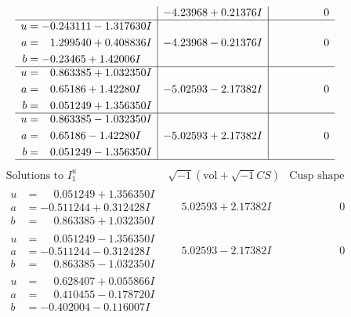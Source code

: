 \documentclass[1p]{elsarticle_modified}
\theoremstyle{definition}
\newcommand{\I}{\sqrt{-1}}
\begin{document}
$$\begin{array}{c|c|c}
 & -4.23968 + 0.21376 I & \phantom{-0.000000 } 0 \\ \hline\begin{aligned}
u &= -0.243111 - 1.317630 I \\
a &= \phantom{-}1.299540 + 0.408836 I \\
b &= -0.23465 + 1.42006 I\end{aligned}
 & -4.23968 - 0.21376 I & \phantom{-0.000000 } 0 \\ \hline\begin{aligned}
u &= \phantom{-}0.863385 + 1.032350 I \\
a &= \phantom{-}0.65186 + 1.42280 I \\
b &= \phantom{-}0.051249 + 1.356350 I\end{aligned}
 & -5.02593 - 2.17382 I & \phantom{-0.000000 } 0 \\ \hline\begin{aligned}
u &= \phantom{-}0.863385 - 1.032350 I \\
a &= \phantom{-}0.65186 - 1.42280 I \\
b &= \phantom{-}0.051249 - 1.356350 I\end{aligned}
 & -5.02593 + 2.17382 I & \phantom{-0.000000 } 0\\
 \hline 
 \end{array}$$\newpage$$\begin{array}{c|c|c}  
\text{Solutions to }I^u_{1}& \I (\text{vol} + \sqrt{-1}CS) & \text{Cusp shape}\\
 \hline 
\begin{aligned}
u &= \phantom{-}0.051249 + 1.356350 I \\
a &= -0.511244 + 0.312428 I \\
b &= \phantom{-}0.863385 + 1.032350 I\end{aligned}
 & \phantom{-}5.02593 + 2.17382 I & \phantom{-0.000000 } 0 \\ \hline\begin{aligned}
u &= \phantom{-}0.051249 - 1.356350 I \\
a &= -0.511244 - 0.312428 I \\
b &= \phantom{-}0.863385 - 1.032350 I\end{aligned}
 & \phantom{-}5.02593 - 2.17382 I & \phantom{-0.000000 } 0 \\ \hline\begin{aligned}
u &= \phantom{-}0.628407 + 0.055866 I \\
a &= \phantom{-}0.410455 - 0.178720 I \\
b &= -0.402004 - 0.116007 I\end{aligned}

\end{array}$$
\end{document}
